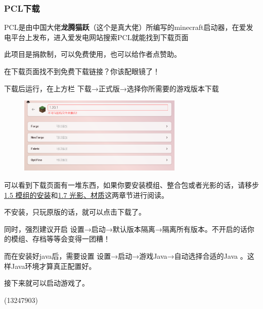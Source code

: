 \documentclass[UTF8,a4paper]{article}
\begin{document}
			\subsubsection{PCL下载}
				\par PCL是由中国大佬\textbf{龙腾猫跃}（这个是真大佬）所编写的minecraft启动器，在爱发电平台上发布，进入爱发电网站搜索PCL就能找到下载页面
				\par 此项目是捐款制，可以免费使用，也可以给作者点赞助。
				\par 在下载页面找不到免费下载链接？你该配眼镜了！
				\par 下载后运行，在上方栏 下载→正式版→选择你所需要的游戏版本下载
				\begin{figure}[H] %
					\centering %
					\includegraphics[width=0.7\textwidth]{./Pictures/PCL_1.jpg} %
				\end{figure}
				\par 可以看到下载页面有一堆东西，如果你要安装模组、整合包或者光影的话，请移步\hyperlink{1.5}{1.5 模组的安装}和\hyperlink{1.7}{1.7 光影、材质}这两章节进行阅读。
				\par 不安装，只玩原版的话，就可以点击下载了。
				\par 同时，强烈建议开启 设置→启动→默认版本隔离→隔离所有版本。不开启的话你的模组、存档等等会变得一团糟！
				\par 而在安装好java后，需要设置 设置→启动→游戏Java→自动选择合适的Java 。这样Java环境才算真正配置好。
				\par 接下来就可以启动游戏了。
				\begin{flushright}(13247903)\end{flushright}
\end{document}
